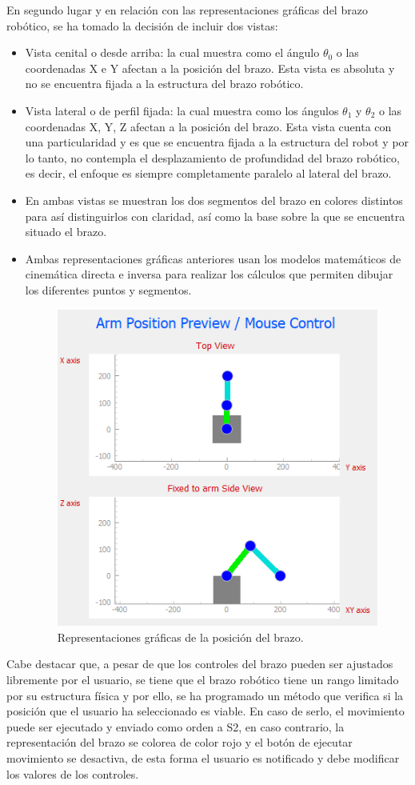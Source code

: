 En segundo lugar y en relación con las representaciones gráficas del brazo robótico, se ha tomado la decisión de incluir dos vistas:
    \begin{itemize}
        \item Vista cenital o desde arriba: la cual muestra como el ángulo $\theta_{0}$ o las coordenadas X e Y afectan a la posición del brazo. Esta vista es absoluta y no se encuentra fijada a la estructura del brazo robótico.
        \item Vista lateral o de perfil fijada: la cual muestra como los ángulos $\theta_{1}$ y $\theta_{2}$ o las coordenadas X, Y, Z afectan a la posición del brazo. Esta vista cuenta con una particularidad y es que se encuentra fijada a la estructura del robot y por lo tanto, no contempla el desplazamiento de profundidad del brazo robótico, es decir, el enfoque es siempre completamente paralelo al lateral del brazo. 
        \item En ambas vistas se muestran los dos segmentos del brazo en colores distintos para  así distinguirlos con claridad, así como la base sobre la que se encuentra situado el brazo.
         \item Ambas representaciones gráficas anteriores usan los modelos matemáticos de cinemática directa e inversa para realizar los cálculos que permiten dibujar los diferentes puntos y segmentos.
        \begin{figure}[H]
            \centering
            \includegraphics[width=0.55\linewidth]{pictures/Views_GUI.PNG}
            \caption{Representaciones gráficas de la posición del brazo.}
            \label{fig:ui_views}
         \end{figure}
    \end{itemize}
    
Cabe destacar que, a pesar de que los controles del brazo pueden ser ajustados libremente por el usuario, se tiene que el brazo robótico tiene un rango limitado por su estructura física y por ello, se ha programado un método que verifica si la posición que el usuario ha seleccionado es viable. En caso de serlo, el movimiento puede ser ejecutado y enviado como orden a \ac{S2}, en caso contrario, la representación del brazo se colorea de color rojo y el botón de ejecutar movimiento se desactiva, de esta forma el usuario es notificado y debe modificar los valores de los controles.    

